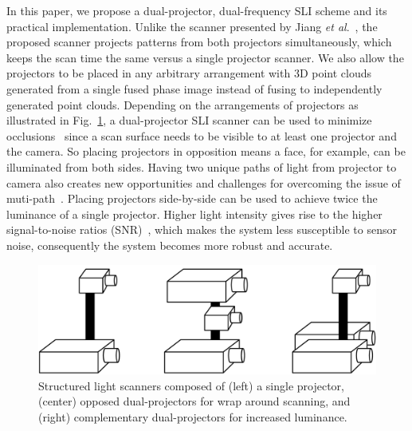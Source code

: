 \documentclass[]{spie}  %
\begin{document}
In this paper, we propose a dual-projector, dual-frequency SLI scheme and its practical implementation. Unlike the scanner presented by Jiang \textit{et al}.~\cite{jian18}, the proposed scanner projects patterns from both projectors simultaneously, which keeps the scan time the same versus a single projector scanner.  We also allow the projectors to be placed in any arbitrary arrangement with 3D point clouds generated from a single fused phase image instead of fusing to independently generated point clouds. Depending on the arrangements of projectors as illustrated in Fig.~\ref{Fig:10}, a dual-projector SLI scanner can be used to minimize occlusions~\cite{linj13} since a scan surface needs to be visible to at least one projector and the camera.  So placing projectors in opposition means a face, for example, can be illuminated from both sides.  Having two unique paths of light from projector to camera also creates new opportunities and challenges for overcoming the issue of muti-path~\cite{otoo16}. Placing projectors side-by-side can be used to achieve twice the luminance of a single projector. Higher light intensity gives rise to the higher signal-to-noise ratios (SNR)~\cite{wangy10}, which makes the system less susceptible to sensor noise, consequently the system becomes more robust and accurate.

\begin{figure}
\centerline{\includegraphics[width=5.0in]{Figures/Layouts}}
\vspace{0.1in}
\caption{Structured light scanners composed of (left) a single projector, (center) opposed dual-projectors for wrap around scanning, and (right) complementary dual-projectors for increased luminance.}
\label{Fig:10}
\end{figure} 
\end{document}
